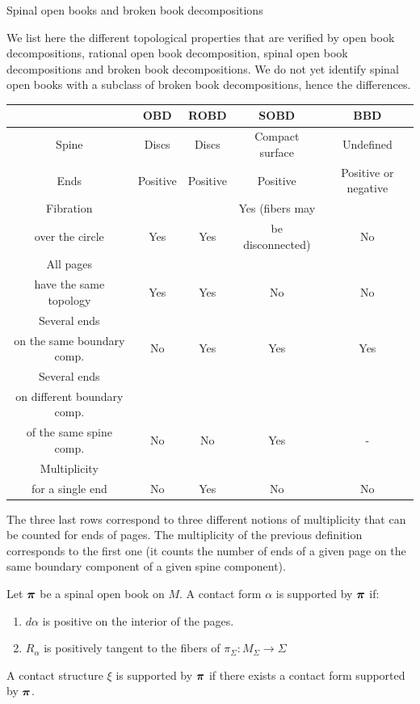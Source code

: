 \documentclass[../main.tex]{subfiles}
\begin{document}
\begin{section}{Spinal open books and broken book decompositions}
\begin{remark}
We list here the different topological properties that are verified by open book decompositions, rational open book decomposition, spinal open book decompositions and broken book decompositions. We do not yet identify spinal open books with a subclass of broken book decompositions, hence the differences.
\begin{center}
   \begin{tabular}{| c | c | c | c | c | }
     \hline
     &OBD & ROBD & SOBD & BBD \\ \hline
Spine  & Discs & Discs & Compact surface & Undefined\\ \hline
Ends     & Positive & Positive & Positive & Positive or negative\\   \hline
Fibration &&&Yes (fibers may&\\over the circle & Yes & Yes & be disconnected) &  No \\ \hline
All pages&&&&\\have the same topology & Yes & Yes & No &  No \\ \hline
Several ends&&&&\\on the same boundary comp.& No & Yes & Yes &  Yes \\ \hline
Several ends&&&&\\on different boundary comp.&&&&\\of the same spine comp.& No & No & Yes &  - \\ \hline
Multiplicity&&&&\\for a single end & No & Yes & No &  No \\ \hline

   \end{tabular}
\end{center}
The three last rows correspond to three different notions of multiplicity that can be counted for ends of pages. The multiplicity of the previous definition corresponds to the first one (it counts the number of ends of a given page on the same boundary component of a given spine component).
\end{remark}

\begin{definition}
Let $\boldsymbol{\pi}$ be a spinal open book on $M$. A contact form $\alpha$ is supported by $\boldsymbol{\pi}$ if:
\begin{enumerate}
    \item $d\alpha$ is positive on the interior of the pages.
    \item $R_\alpha$ is positively tangent to the fibers of $\pi_\Sigma : M_\Sigma\rightarrow \Sigma$
\end{enumerate}
A contact structure $\xi$ is supported by $\boldsymbol{\pi}$ if there exists a contact form supported by $\boldsymbol{\pi}$.
\end{definition}


\end{section}
\end{document}
